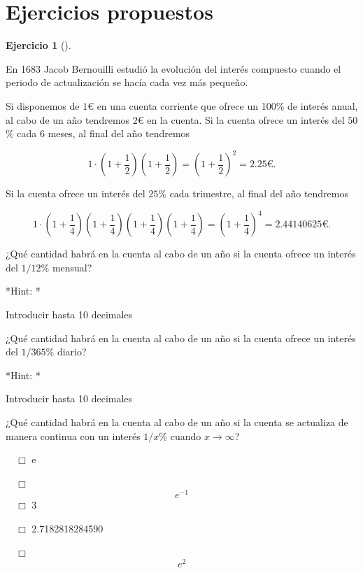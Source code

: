 \documentclass[
  a4paper,
]{scrreport}
\theoremstyle{definition}
\newtheorem{exercise}{Ejercicio}[chapter]
\theoremstyle{remark}
\begin{document}
\hypertarget{ejercicios-propuestos-2}{%
\section{Ejercicios propuestos}\label{ejercicios-propuestos-2}}

\leavevmode{}%
\begin{exercise}[]\label{exr-interes-compuesto}

En 1683 Jacob Bernouilli estudió la evolución del interés compuesto
cuando el periodo de actualización se hacía cada vez más pequeño.

Si disponemos de \(1\)€ en una cuenta corriente que ofrece un 100\% de
interés anual, al cabo de un año tendremos \(2\)€ en la cuenta. Si la
cuenta ofrece un interés del \(50\)\% cada 6 meses, al final del año
tendremos

\[
1\cdot\left(1+\frac{1}{2}\right)\left(1+\frac{1}{2}\right)= \left(1+\frac{1}{2}\right)^2 = 2.25\mbox{€}.
\]

Si la cuenta ofrece un interés del \(25\)\% cada trimestre, al final del
año tendremos

\[
1\cdot\left(1+\frac{1}{4}\right)\left(1+\frac{1}{4}\right)\left(1+\frac{1}{4}\right)\left(1+\frac{1}{4}\right)= \left(1+\frac{1}{4}\right)^4 = 2.44140625\mbox{€}.
\]

¿Qué cantidad habrá en la cuenta al cabo de un año si la cuenta ofrece
un interés del \(1/12\)\% mensual?

\vspace{18pt}*Hint: *

Introducir hasta 10 decimales

¿Qué cantidad habrá en la cuenta al cabo de un año si la cuenta ofrece
un interés del \(1/365\)\% diario?

\vspace{18pt}*Hint: *

Introducir hasta 10 decimales

¿Qué cantidad habrá en la cuenta al cabo de un año si la cuenta se
actualiza de manera continua con un interés \(1/x\)\% cuando
\(x\to\infty\)?

${\quad\Box}$ e

${\quad\Box}$ $$e^{-1}$$
${\quad\Box}$ 3

${\quad\Box}$ 2.7182818284590

${\quad\Box}$ $$e^2$$

\end{exercise}
\end{document}
